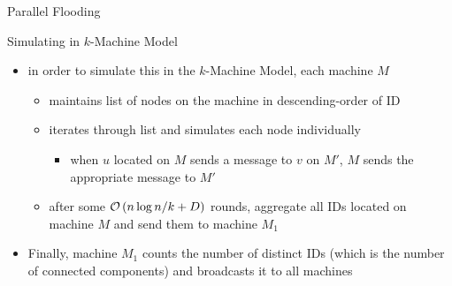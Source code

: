 \begin{frame}{Parallel Flooding}
{
    }
\end{frame}

\begin{frame}{Simulating in $k$-Machine Model}
    \begin{itemize}
        \item in order to simulate this in the $k$-Machine Model, each machine $M$
              \begin{itemize}
                  \item maintains list of nodes on the machine in descending-order of ID
                  \item iterates through list and simulates each node individually
                        \begin{itemize}
                            \item when $u$ located on $M$ sends a message to $v$ on $M'$, $M$ sends the appropriate message to $M'$
                        \end{itemize}
                  \item after some $\mathcal{O}\left(n\log{n} / k + D\right)$ rounds,
                        aggregate all IDs located on machine $M$ and send them to
                        machine $M_1$
              \end{itemize}
        \item Finally, machine $M_1$ counts the number of distinct IDs (which is the number of connected components) and broadcasts it to all machines
    \end{itemize}
\end{frame}

